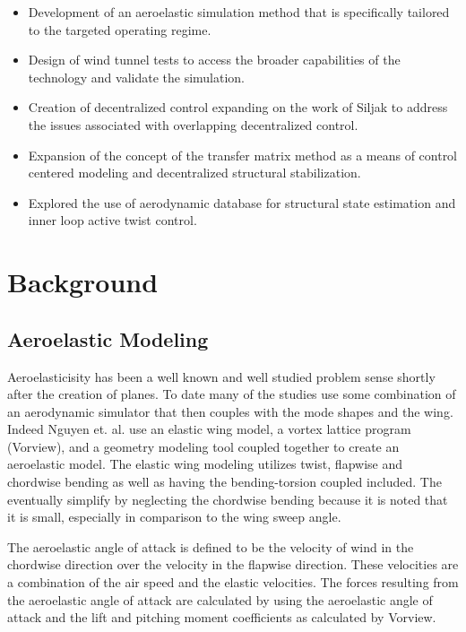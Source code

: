 \documentclass[11pt]{ucthesis}
\begin{document}
\begin{itemize}
\item Development of an aeroelastic simulation method that is specifically tailored to the targeted operating regime. 
\item Design of wind tunnel tests to access the broader capabilities of the technology and validate the simulation.
\item Creation of decentralized control expanding on the work of Siljak \cite{siljak2011decentralized} to address the issues associated with overlapping decentralized control.
\item Expansion of the concept of the transfer matrix method as a means of control centered modeling and decentralized structural stabilization.
\item Explored the use of aerodynamic database for structural state estimation and inner loop active twist control.
\end{itemize}

\chapter{Background}
\section{Aeroelastic Modeling}
\label{sec:aeroMoldLit}

Aeroelasticisity has been a well known and well studied problem sense shortly after the creation of planes.   To date many of the studies use some combination of an aerodynamic simulator that then couples with the mode shapes and the wing. Indeed Nguyen et. al. \cite{nguyencoupled} use an elastic wing model, a vortex lattice program (Vorview), and a geometry modeling tool coupled together to create an aeroelastic model. The elastic wing modeling utilizes twist, flapwise and chordwise bending as well as having the bending-torsion coupled included. The eventually simplify by neglecting the chordwise bending because it is noted that it is small, especially in comparison to the wing sweep angle.

The aeroelastic angle of attack is defined to be the velocity of wind in the chordwise direction over the velocity in the flapwise direction. These velocities are a combination of the air speed and the elastic velocities. The forces resulting from the aeroelastic angle of attack are calculated by using the aeroelastic angle of attack and the lift and pitching moment coefficients as calculated by Vorview.
\end{document}
